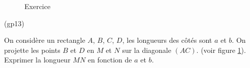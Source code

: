 \begin{figure}[ht]
 \centering

\caption{Exercice }
\label{fig:Egp13_1}
\end{figure}
\begin{tiny}(gp13)\end{tiny} On considère un rectangle $A$, $B$, $C$, $D$, les longueurs des côtés sont $a$ et $b$. On projette les points $B$ et $D$ en $M$ et $N$ sur la diagonale $(AC)$. (voir figure \ref{fig:Egp13_1}).\newline
Exprimer la longueur $MN$ en fonction de $a$ et $b$.